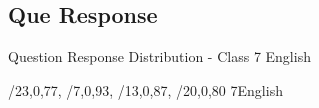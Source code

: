\label{4.3 C7E Question Response Distribution}
\subsection{Que Response}
\renewcommand{\insertclass}{- Class 7}
\renewcommand{\insertsubject}{ - English}
\begin{frame}{Question Response Distribution - Class 7 English}
\vspace{-3mm}
\begin{minipage}{0.45\paperwidth}
{/{23,0,77},
/{7,0,93},
/{13,0,87},
/{20,0,80}}
{7}{English}
    \end{minipage}%
    \begin{minipage}{0.05\paperwidth}
        \hfill 
    \end{minipage}%
    \begin{minipage}{0.45\paperwidth}
    \queresponselegend
    \end{minipage}
\end{frame}
%



